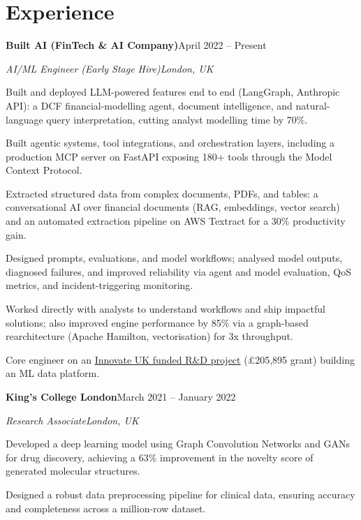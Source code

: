 \documentclass[10pt,a4paper]{article}
\newcommand{\entry}[4]{%
  {\color{company}\bfseries #1}\hfill {\color{muted}#2}\par
  \vspace{1pt}
  {\itshape #3}\hfill {\color{muted}\itshape #4}\par
  \vspace{3pt}%
}
\begin{document}
\section{Experience}
\entry{Built AI (FinTech \& AI Company)}{April 2022 -- Present}{AI/ML Engineer (Early Stage Hire)}{London, UK}
\begin{tight}
  \item Built and deployed LLM-powered features end to end (LangGraph, Anthropic API): a DCF financial-modelling agent, document intelligence, and natural-language query interpretation, cutting analyst modelling time by 70\%.
  \item Built agentic systems, tool integrations, and orchestration layers, including a production MCP server on FastAPI exposing 180+ tools through the Model Context Protocol.
  \item Extracted structured data from complex documents, PDFs, and tables: a conversational AI over financial documents (RAG, embeddings, vector search) and an automated extraction pipeline on AWS Textract for a 30\% productivity gain.
  \item Designed prompts, evaluations, and model workflows; analysed model outputs, diagnosed failures, and improved reliability via agent and model evaluation, QoS metrics, and incident-triggering monitoring.
  \item Worked directly with analysts to understand workflows and ship impactful solutions; also improved engine performance by 85\% via a graph-based rearchitecture (Apache Hamilton, vectorisation) for 3x throughput.
  \item Core engineer on an \href{https://gtr.ukri.org/projects?ref=10022996}{Innovate UK funded R\&D project} (\pounds205,895 grant) building an ML data platform.
\end{tight}

\entry{King's College London}{March 2021 -- January 2022}{Research Associate}{London, UK}
\begin{tight}
  \item Developed a deep learning model using Graph Convolution Networks and GANs for drug discovery, achieving a 63\% improvement in the novelty score of generated molecular structures.
  \item Designed a robust data preprocessing pipeline for clinical data, ensuring accuracy and completeness across a million-row dataset.
\end{tight}
\end{document}
